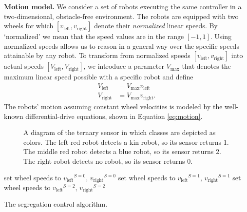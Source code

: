 \documentclass[letterpaper, 10 pt, conference]{ieeeconf}
\newcommand{\myparagraph}[1]{\textbf{#1.}}
\begin{document}
\newcommand{\vL}{\ensuremath{v_{\text{left}}}}
\newcommand{\vR}{\ensuremath{v_{\text{right}}}}
\newcommand{\vaL}{\ensuremath{V_{\text{left}}}}
\newcommand{\vaR}{\ensuremath{V_{\text{right}}}}
\newcommand{\VM}{\ensuremath{V_{\text{max}}}}
\myparagraph{Motion model}
We consider a set of robots executing the same controller in a two-dimensional,
obstacle-free environment. The robots are equipped with two wheels for which
$[\vL,\vR]$ denote their \emph{normalized} linear speeds. By `normalized' we
mean that the speed values are in the range $[-1, 1]$. Using normalized speeds
allows us to reason in a general way over the specific speeds attainable by any
robot. To transform from normalized speeds $[\vL,\vR]$ into actual speeds
$[\vaL,\vaR]$, we introduce a parameter $\VM$ that denotes the maximum linear
speed possible with a specific robot and define
\begin{align}
  \vaL &= \VM \vL\\
  \vaR &= \VM \vR.
\end{align}
The robots' motion assuming constant wheel velocities is modeled by the well-known differential-drive
equations, shown in Equation \eqref{eq:motion}.

\newcommand{\vPN}[2]{\ensuremath{v_{\text{#1}}}^{S=#2}}
\newcommand{\robot}[2]{%
  \filldraw[draw=#2,fill=#2!20] (#1) circle(5mm);
  \draw[draw=#2,->,-Stealth,rotate around={0:(#1)}] (#1) -- +(5mm,0);
  \fill[fill=gray!20] ($(#1)+(5mm,0)$) -- +( 45:1cm) -- +(-45:1cm) -- cycle;%
  \fill[fill=#2] ($(#1)+(5mm,0)$) circle (1mm);%
  }
  \begin{figure}[t]
    \centering
    \caption{A diagram of the ternary sensor in which classes are depicted
    as colors. The left red robot detects a kin robot, so its sensor
    returns 1. The middle red robot detects a blue robot, so its sensor
    returns 2. The right robot detects no robot, so its sensor returns
    0.}
    \label{fig:sensor}
  \end{figure}
  \begin{algorithm}[t]
    \begin{algorithmic}
       \State set wheel speeds to $\vPN{left}{0}$, $\vPN{right}{0}$
       \State set wheel speeds to $\vPN{left}{1}$, $\vPN{right}{1}$
      \Else \State set wheel speeds to $\vPN{left}{2}$, $\vPN{right}{2}$
      \EndIf
    \end{algorithmic}
    \caption{The segregation control algorithm.}
    \label{alg:controller}
  \end{algorithm}
\end{document}
